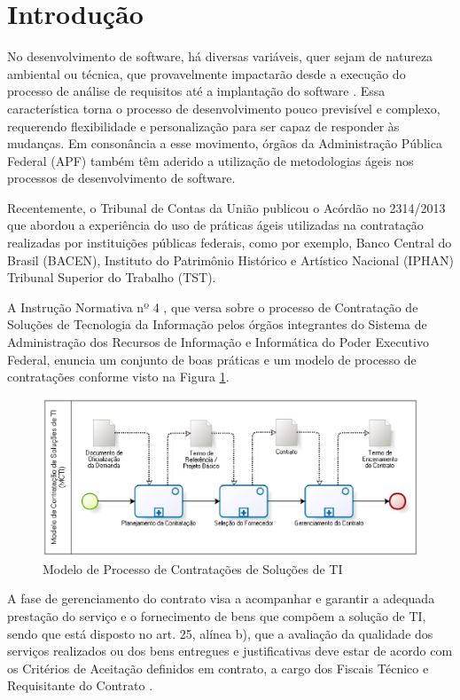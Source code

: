 \section{Introdução}
\label{intro}

No desenvolvimento de software, há diversas variáveis, quer sejam de natureza ambiental ou técnica, que provavelmente impactarão desde a execução do processo de análise de requisitos até a implantação do software \cite{beckarticle1999}. Essa característica torna o processo de desenvolvimento pouco previsível e complexo, requerendo flexibilidade e personalização para ser capaz de responder às mudanças. 
Em consonância a esse movimento, órgãos da Administração Pública Federal (APF) também têm aderido a utilização de metodologias ágeis nos processos de desenvolvimento de software.

Recentemente, o Tribunal de Contas da União publicou o Acórdão no 2314/2013 \cite{TCU:2013}
que abordou a experiência do uso de práticas ágeis utilizadas na contratação realizadas por instituições públicas federais, como por exemplo, Banco Central do Brasil (BACEN), Instituto do Patrimônio Histórico e Artístico Nacional (IPHAN) Tribunal Superior do Trabalho (TST). 

A Instrução Normativa nº 4 \cite{IN04:2010}, que versa sobre o processo de Contratação de Soluções de Tecnologia da Informação pelos órgãos integrantes do Sistema de Administração dos Recursos de Informação e Informática do Poder Executivo Federal, enuncia um conjunto de boas práticas e um modelo de processo de contratações conforme visto na Figura \ref{processo}. 

\begin{figure}[h]
        \centering
        \label{processo}
            \includegraphics[scale=0.7]{figuras/MCTI.eps}
        \caption{Modelo de Processo de Contratações de Soluções de TI \cite{mcti}}
\end{figure}
\FloatBarrier

A fase de gerenciamento do contrato visa a acompanhar e garantir a adequada prestação do serviço e o fornecimento de bens que compõem a solução de TI, sendo que está disposto no art. 25, alínea b), que a avaliação da qualidade dos serviços realizados ou dos bens entregues e justificativas deve estar de acordo com os Critérios de Aceitação definidos em contrato, a cargo dos Fiscais Técnico e Requisitante do Contrato \cite{IN04:2010}.


